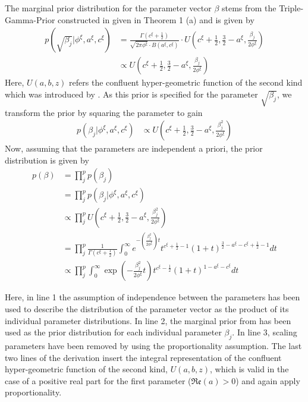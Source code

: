 \documentclass[12pt,a4paper]{article}
\begin{document}
The marginal prior distribution for the parameter vector $\beta$ stems from the Triple-Gamma-Prior constructed in \textcite{TGP2020} given in Theorem 1 (a) and is given by
\begin{align*}
p(\sqrt{\beta_j}|\phi^\xi, a^\xi, c^\xi) &= \frac{\Gamma(c^\xi + \frac{1}{2})}{\sqrt{2\pi \phi^\xi}\cdot B(a^\xi, c^\xi)}\cdot U\left(c^\xi + \frac{1}{2}, \frac{3}{2}-a^\xi, \frac{\beta_j}{2\phi^\xi}\right)\\
&\propto U\left(c^\xi + \frac{1}{2}, \frac{3}{2}-a^\xi, \frac{\beta_j}{2\phi^\xi}\right)
\end{align*}
Here, $U(a,b,z)$ refers the confluent hyper-geometric function of the second kind which was introduced by \textcite{Tricomi1947}. As this prior is specified for the parameter $\sqrt{\beta_j}$, we transform the prior by squaring the parameter to gain
\begin{align*}
p(\beta_j|\phi^\xi, a^\xi, c^\xi) &\propto U\left(c^\xi + \frac{1}{2}, \frac{3}{2}-a^\xi, \frac{\beta_j^2}{2\phi^\xi}\right)
\end{align*}
Now, assuming that the parameters are independent a priori, the prior distribution is given by
\begin{align}
p(\beta) 	&= \prod_j^p p(\beta_j) \nonumber\\
			&= \prod_j^p p(\beta_j|\phi^\xi, a^\xi, c^\xi) \nonumber\\
			&\propto \prod_j^p U\left(c^\xi + \frac{1}{2}, \frac{3}{2}-a^\xi, \frac{\beta_j^2}{2\phi^\xi}\right) \nonumber\\
			&= \prod_j^p \frac{1}{\Gamma(c^\xi + \frac{1}{2})}\int_0^\infty e^{-(\frac{\beta_j^2}{2\phi^\xi})t}t^{c^\xi + \frac{1}{2}-1}(1+t)^{\frac{3}{2}-a^\xi-c^\xi + \frac{1}{2}-1}dt \nonumber\\
			&\propto \prod_j^p \int_0^\infty \exp\left(-\frac{\beta_j^2}{2\phi^\xi}t\right)t^{c^\xi - \frac{1}{2}}(1+t)^{1-a^\xi-c^\xi} dt \label{eq:prior}
\end{align}

Here, in line 1 the assumption of independence between the parameters has been used to describe the distribution of the parameter vector as the product of its individual parameter distributions. In line 2, the marginal prior from \textcite{TGP2020} has been used as the prior distribution for each individual parameter $\beta_j$. In line 3, scaling parameters have been removed by using the proportionality assumption. The last two lines of the derivation insert the integral representation of the confluent hyper-geometric function of the second kind, $U(a,b,z)$, which is valid in the case of a positive real part for the first parameter ($\mathfrak{Re}(a) > 0$) and again apply proportionality.\\
\end{document}
